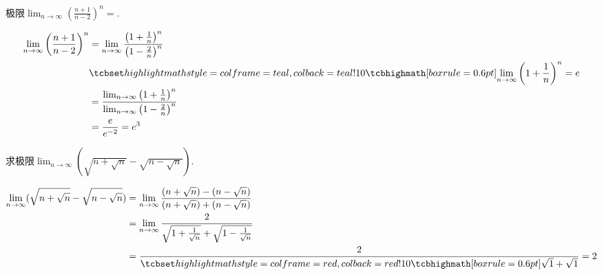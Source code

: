 \documentclass{ctexart}
\begin{document}
\mytoc
\tableofcontents
\clearpage

\begin{ques}[date=2020-8-20]
  极限$\lim_{n \to \infty} \left( \frac{n+1}{n-2} \right) ^n=$\blank.
\begin{solution}
  \begin{align*}
    \lim_{n \to \infty} \left( \frac{n+1}{n-2} \right) ^n
    &= \lim_{n \to \infty} \frac{\left( 1 + \frac{1}{n} \right) ^n}{\left( 1 -
    \frac{2}{n} \right) ^n}\\
    & \hint{\lim_{n \to \infty} \left( 1 + \frac{1}{n} \right) ^n = e}
    \\
    & = \frac{\lim_{n \to \infty} \left( 1 + \frac{1}{n} \right) ^n}{\lim_{n
    \to \infty} \left( 1 - \frac{2}{n} \right) ^n}\\
    & = \frac{e}{e^{-2}} = e^3
  \end{align*}
\end{solution}
\end{ques}

\begin{ques}[date=2020-8-20]
  求极限$\lim_{n \to \infty} (\sqrt{n + \sqrt{n}} - \sqrt{n - \sqrt{n}})$.
\begin{solution}
  \begin{align*}
    \lim_{n \to \infty} (\sqrt{n + \sqrt{n}} - \sqrt{n - \sqrt{n}})
    &= \lim_{n \to \infty} \frac{(n + \sqrt{n}) - (n - \sqrt{n})}{(n +
    \sqrt{n}) + (n - \sqrt{n})}\\
    &= \lim_{n \to \infty} \frac{2}{\sqrt{1 + \frac{1}{\sqrt{n}}} + \sqrt{1 -
    \frac{1}{\sqrt{n}}}}\\
    &= \frac{2}{\error{\sqrt{1} + \sqrt{1}}} = 2
  \end{align*}
\end{solution}
\end{ques}
\end{document}
